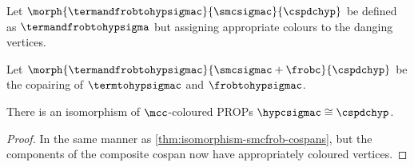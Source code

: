 \begin{definition}
    Let \(\morph{\termandfrobtohypsigmac}{\smcsigmac}{\cspdchyp}\) be defined
    as \(\termandfrobtohypsigma\) but assigning appropriate colours to the
    danging vertices.
\end{definition}

\begin{definition}
    Let \(
    \morph{\termandfrobtohypsigmac}{\smcsigmac + \frobc}{\cspdchyp}
    \) be the copairing of \(\termtohypsigmac\) and
    \(\frobtohypsigmac\).
\end{definition}

\begin{theorem}
    There is an isomorphism of \(\mcc\)-coloured PROPs
    \(\hypcsigmac \cong \cspdchyp\).
\end{theorem}
\begin{proof}
    In the same manner as \cref{thm:isomorphism-smcfrob-cospans}, but the
    components of the composite cospan now have appropriately coloured vertices.
\end{proof}